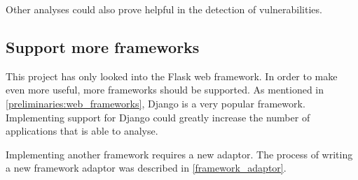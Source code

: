 Other analyses could also prove helpful in the detection of vulnerabilities.

\subsection{Support more frameworks}
This project has only looked into the Flask web framework.
In order to make \pyt{} even more useful, more frameworks should be supported.
As mentioned in \cref{preliminaries:web_frameworks}, Django is a very popular framework.
Implementing support for Django could greatly increase the number of applications that \pyt{} is able to analyse.

Implementing another framework requires a new adaptor.
The process of writing a new framework adaptor was described in \cref{framework_adaptor}.
